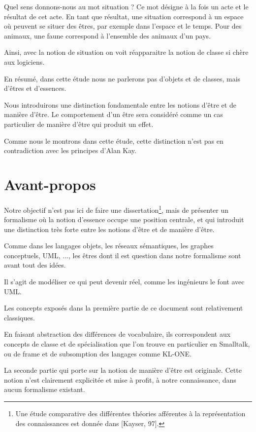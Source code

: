 \documentclass[a4paper, 12pt, openright, french]{book}
\begin{document}
Quel sens donnons-nous au mot situation ? Ce mot désigne à la fois un
acte et le résultat de cet acte. En tant que résultat, une situation
correspond à un espace où peuvent se situer des êtres, par exemple dans
l'espace et le temps. Pour des animaux, une faune
correspond à l'ensemble des animaux d'un
pays.

Ainsi, avec la notion de situation on voit réapparaitre la notion de
classe si chère aux logiciens.

En résumé, dans cette étude nous ne parlerons pas
d'objets et de classes, mais d'êtres et
d'essences.

Nous introduirons une distinction fondamentale entre les notions
d'être et de manière d'être. Le
comportement d'un être sera considéré comme un cas
particulier de manière d'être qui produit un effet.

Comme nous le montrons dans cette étude, cette distinction
n'est pas en contradiction avec les principes
d'Alan Kay.

\cleardoublepage
\chapter{Avant-propos}
Notre objectif n'est pas ici de faire une
dissertation\footnote{Une étude comparative des différentes théories afférentes à la représentation des connaissances est donnée dans [Kayser, 97].}, mais de présenter un formalisme où la notion d'essence occupe une position
centrale, et qui introduit une distinction très forte entre les notions
d'être et de manière d'être.

Comme dans les langages objets, les réseaux sémantiques, les graphes conceptuels, UML, ..., les êtres dont il est question dans notre formalisme sont avant tout des idées.

Il s'agit de modéliser ce qui peut devenir réel, comme les ingénieurs le font avec UML.

Les concepts exposés dans la première partie de ce document sont
relativement classiques. 

En faisant abstraction des différences de
vocabulaire, ils correspondent aux concepts de classe et de
spécialisation que l'on trouve en
particulier en Smalltalk, ou de frame et de subsomption des langages comme KL-ONE.

La seconde partie qui porte sur la notion de manière d'être
est originale. Cette notion n'est clairement
explicitée et mise à profit, à notre connaissance, dans aucun formalisme
existant.
\end{document}

